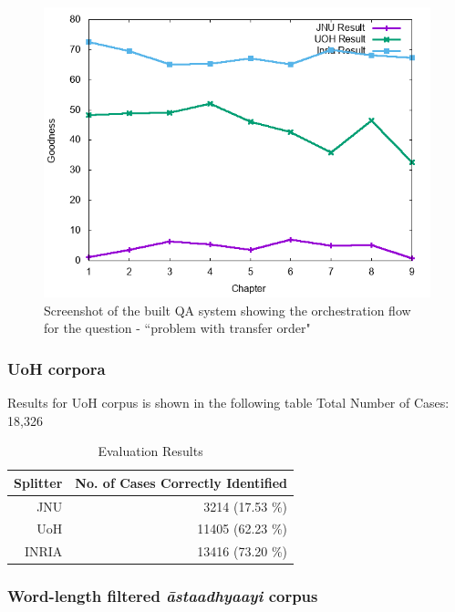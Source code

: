\documentclass[11pt]{article}
\begin{document}
\begin{figure}[h]
	\center
	\includegraphics[scale=0.34]{images/split.png}
	\caption{\label{screen}Screenshot of the built QA system showing the orchestration flow for the question - ``problem with transfer order"}
\end{figure}


\subsubsection{UoH corpora}

Results for UoH corpus is shown in the following table
Total Number of Cases: 18,326


\begin{table}[h]
\begin{center}
\begin{tabular}{| r | r | }
\hline  \bf Splitter & \bf No. of Cases Correctly Identified \\
\hline
JNU & 3214 (17.53 \%) \\
UoH & 11405 (62.23 \%) \\
INRIA & 13416 (73.20 \%)\\
\hline
\end{tabular}
\end{center}
\caption{\label{font-table} Evaluation Results }
\end{table}


\subsubsection{Word-length filtered \textit{\={a}staadhyaayi} corpus}
    
\end{document}
